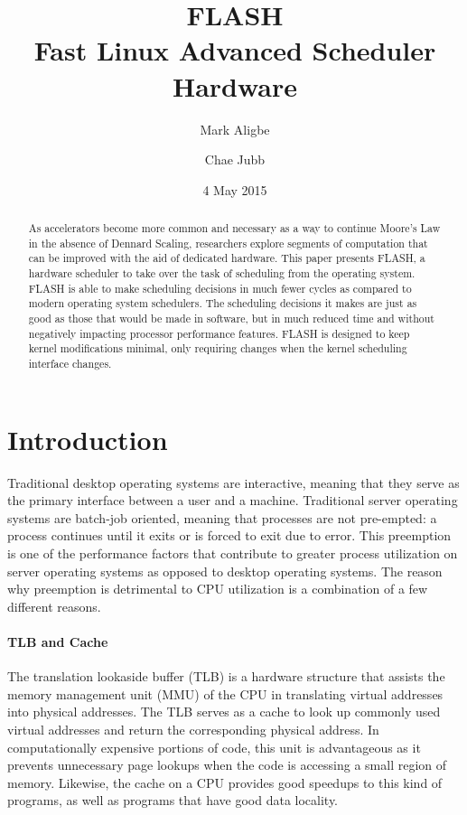 \documentclass{sig-alternate-10pt}
\title{FLASH\\Fast Linux Advanced Scheduler Hardware}
\author{
	Mark Aligbe \\
	    \email{ma2799@columbia.edu}
	\and
    Chae Jubb \\
        \email{ecj2122@columbia.edu}
}
\date{4 May 2015}
\begin{document}
\maketitle

\begin{abstract}
As accelerators become more common and necessary as a way to continue Moore's Law in the absence of Dennard Scaling, researchers explore segments of computation that can be improved with the aid of dedicated hardware. This paper presents FLASH, a hardware scheduler to take over the task of scheduling from the operating system. FLASH is able to make scheduling decisions in much fewer cycles as compared to modern operating system schedulers. The scheduling decisions it makes are just as good as those that would be made in software, but in much reduced time and without negatively impacting processor performance features. FLASH is designed to keep kernel modifications minimal, only requiring changes when the kernel scheduling interface changes.

\end{abstract}


\section{Introduction}
\label{sec:intro}
Traditional desktop operating systems are interactive, meaning that they serve as the primary interface between a user and a machine. Traditional server operating systems are batch-job oriented, meaning that processes are not pre-empted: a process continues until it exits or is forced to exit due to error. This preemption is one of the performance factors that contribute to greater process utilization on server operating systems as opposed to desktop operating systems. The reason why preemption is detrimental to CPU utilization is a combination of a few different reasons.

\paragraph{TLB and Cache}
The translation lookaside buffer (TLB) is a hardware structure that assists the memory management unit (MMU) of the CPU in translating virtual addresses into physical addresses. The TLB serves as a cache to look up commonly used virtual addresses and return the corresponding physical address. In computationally expensive portions of code, this unit is advantageous as it prevents unnecessary page lookups when the code is accessing a small region of memory. Likewise, the cache on a CPU provides good speedups to this kind of programs, as well as programs that have good data locality.
\end{document}
